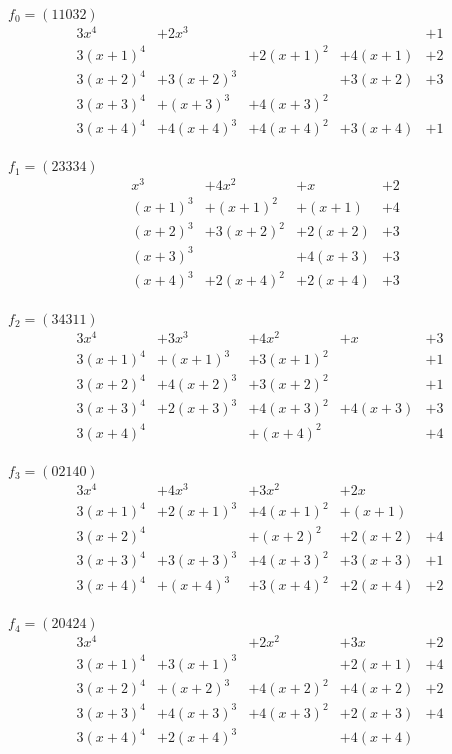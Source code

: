 \documentclass[a4paper, 12pt]{extarticle}
\begin{document}
$f_0 = (11032)$
$$\begin{array}{ccccc}
3x^4 & + 2x^3 &  &  & + 1 \\
3(x + 1)^4 &  & + 2(x + 1)^2 & + 4(x + 1) & + 2 \\
3(x + 2)^4 & + 3(x + 2)^3 &  & + 3(x + 2) & + 3 \\
3(x + 3)^4 & + (x + 3)^3 & + 4(x + 3)^2 &  &  \\
3(x + 4)^4 & + 4(x + 4)^3 & + 4(x + 4)^2 & + 3(x + 4) & + 1 \\
\end{array}$$

$f_1 = (23334)$
$$\begin{array}{ccccc}
 &  x^3 & + 4x^2 & + x & + 2 \\
 &  (x + 1)^3 & + (x + 1)^2 & + (x + 1) & + 4 \\
 &  (x + 2)^3 & + 3(x + 2)^2 & + 2(x + 2) & + 3 \\
 &  (x + 3)^3 &  & + 4(x + 3) & + 3 \\
 &  (x + 4)^3 & + 2(x + 4)^2 & + 2(x + 4) & + 3 \\
\end{array}$$

$f_2 = (34311)$
$$\begin{array}{ccccc}
3x^4 & + 3x^3 & + 4x^2 & + x & + 3 \\
3(x + 1)^4 & + (x + 1)^3 & + 3(x + 1)^2 &  & + 1 \\
3(x + 2)^4 & + 4(x + 2)^3 & + 3(x + 2)^2 &  & + 1 \\
3(x + 3)^4 & + 2(x + 3)^3 & + 4(x + 3)^2 & + 4(x + 3) & + 3 \\
3(x + 4)^4 &  & + (x + 4)^2 &  & + 4 \\
\end{array}$$

$f_3 = (02140)$
$$\begin{array}{ccccc}
3x^4 & + 4x^3 & + 3x^2 & + 2x &  \\
3(x + 1)^4 & + 2(x + 1)^3 & + 4(x + 1)^2 & + (x + 1) &  \\
3(x + 2)^4 &  & + (x + 2)^2 & + 2(x + 2) & + 4 \\
3(x + 3)^4 & + 3(x + 3)^3 & + 4(x + 3)^2 & + 3(x + 3) & + 1 \\
3(x + 4)^4 & + (x + 4)^3 & + 3(x + 4)^2 & + 2(x + 4) & + 2 \\
\end{array}$$

$f_4 = (20424)$
$$\begin{array}{ccccc}
3x^4 &  & + 2x^2 & + 3x & + 2 \\
3(x + 1)^4 & + 3(x + 1)^3 &  & + 2(x + 1) & + 4 \\
3(x + 2)^4 & + (x + 2)^3 & + 4(x + 2)^2 & + 4(x + 2) & + 2 \\
3(x + 3)^4 & + 4(x + 3)^3 & + 4(x + 3)^2 & + 2(x + 3) & + 4 \\
3(x + 4)^4 & + 2(x + 4)^3 &  & + 4(x + 4) &  \\
\end{array}$$
\end{document}
